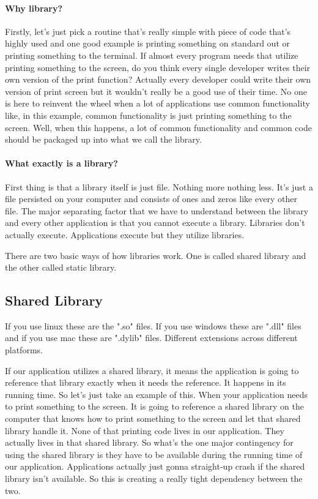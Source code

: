 \paragraph{Why library?}
Firstly, let's just pick a routine that's really simple with piece of code that's highly used and one good example is printing something on standard out or printing something to the terminal. If
almost every program needs that utilize printing something to the screen, do you think every single developer writes their own version of the print function? Actually every developer could write their own version of print screen but it wouldn't really be a good use of their time. No one is here to reinvent the wheel when a lot of applications use common functionality like, in this example, common functionality is just printing something to the screen. Well, when this happens, a lot of common functionality and common code should be packaged up into what we call the library.

\paragraph{What exactly is a library?}
First thing is that a library itself is just file. Nothing more nothing less. It's just a file persisted on your computer and consists of ones and zeros like every other file\cite{Wexelblat-81}. The major separating factor that we have to understand between the library and every other application is that you cannot execute a library. Libraries don't actually execute. Applications execute but they utilize libraries\cite{Wexelblat-81}. 


There are two basic ways of how libraries work. One is called shared library and the other called static library.
	
	\subsection{Shared Library}
	If you use linux these are the ".so" files. If you use windows these are ".dll" files and if you use mac these are ".dylib" files. Different extensions across different platforms. 
	
	If our application utilizes a shared library, it means the application is going to reference that library exactly when it needs the reference\cite{Hart-05}\cite{Rector-05}. It happens in its running time. So let's just take an example of this. When your application needs to print something to the screen. It is going to reference a shared library on the computer that knows how to print something to the screen and let that shared library handle it. None of that printing code lives in our application. They actually lives in that shared library. So what's the one major contingency for using the shared library is they have to be available during the running time of our application. Applications actually just gonna straight-up crash if the shared library isn't available. So this is creating a really tight dependency between the two\cite{Hart-05}\cite{Rector-05}. 
	
